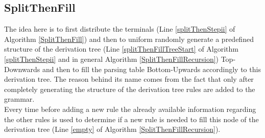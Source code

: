 \noindent
{}



\pagebreak
\subsection{SplitThenFill}

The idea here is to first distribute the terminals (Line \ref{splitThenStepii} of Algorithm \ref{SplitThenFill}) and then to uniform randomly generate a predefined structure of the derivation tree (Line \ref{splitThenFillTreeStart} of Algorithm \ref{splitThenStepii} and in general Algorithm \ref{SplitThenFillRecursion}) Top-Downwards and then to fill the parsing table Bottom-Upwards accordingly to this derivation tree. The reason behind its name comes from the fact that only after completely generating the structure of the derivation tree rules are added to the grammar. \\
Every time before adding a new rule the already available information regarding the other rules is used to determine if a new rule is needed to fill this node of the derivation tree (Line \ref{empty} of Algorithm \ref{SplitThenFillRecursion}).\\


